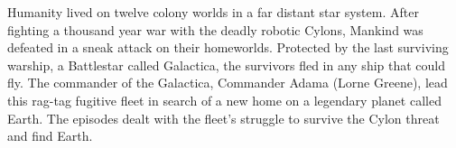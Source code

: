 Humanity lived on twelve colony worlds in a far distant star system. After fighting a thousand year war with the deadly robotic Cylons, Mankind was defeated in a sneak attack on their homeworlds. Protected by the last surviving warship, a Battlestar called Galactica, the survivors fled in any ship that could fly. The commander of the Galactica, Commander Adama (Lorne Greene), lead this rag-tag fugitive fleet in search of a new home on a legendary planet called Earth. The episodes dealt with the fleet's struggle to survive the Cylon \cite{Goswami:2002a} threat and find Earth.
